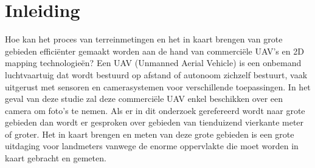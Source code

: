 \documentclass{hogent-article}
\begin{document}
\tableofcontents

\bigskip





\section{Inleiding}%
\label{sec:inleiding}


Hoe kan het proces van terreinmetingen en het in kaart brengen van grote gebieden efficiënter gemaakt worden aan de hand van commerciële UAV's en 2D mapping technologieën?
Een UAV (Unmanned Aerial Vehicle) is een onbemand luchtvaartuig dat wordt bestuurd op afstand of autonoom zichzelf bestuurt, vaak uitgerust met sensoren en camerasystemen voor verschillende toepassingen.
In het geval van deze studie zal deze commerciële UAV enkel beschikken over een camera om foto's te nemen.
Als er in dit onderzoek gerefereerd wordt naar grote gebieden dan wordt er gesproken over gebieden van tienduizend vierkante meter of groter.
Het in kaart brengen en meten van deze grote gebieden is een grote uitdaging voor landmeters vanwege de enorme oppervlakte die moet worden in kaart gebracht en gemeten.
\end{document}
